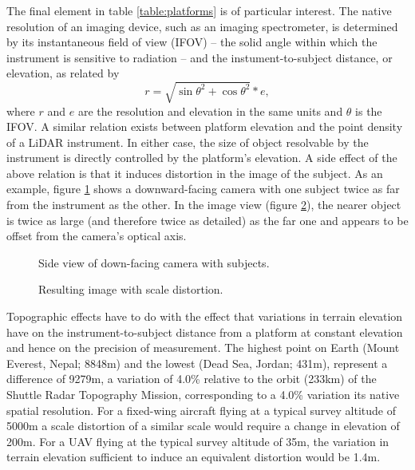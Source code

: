 \documentclass[10pt,a4paper]{report}
\begin{document}
The final element in table \ref{table:platforms} is of particular interest. The native resolution of an imaging device, such as an imaging spectrometer, is determined by its instantaneous field of view (IFOV) -- the solid angle within which the instrument is sensitive to radiation -- and the instument-to-subject distance, or elevation, as related by
\begin{equation}
r = \sqrt{\sin{\theta}^2+\cos{\theta}^2}*e,
\label{eq:ifov}
\end{equation} 
where $r$ and $e$ are the resolution and elevation in the same units and $\theta$ is the IFOV. A similar relation exists between platform elevation and the point density of a LiDAR instrument. In either case, the size of object resolvable by the instrument is directly controlled by the platform's elevation. A side effect of the above relation is that it induces distortion in the image of the subject. As an example, figure \ref{fig:scale_cam} shows a downward-facing camera with one subject twice as far from the instrument as the other. In the image view (figure \ref{fig:scale_img}), the nearer object is twice as large (and therefore twice as detailed) as the far one and appears to be offset from the camera's optical axis.

\begin{figure}
\centering
\def\svgscale{0.5}

\caption{Side view of down-facing camera with subjects.}
\label{fig:scale_cam}
\end{figure}

\begin{figure}
\centering
\def\svgscale{0.5}

\caption{Resulting image with scale distortion.}
\label{fig:scale_img}
\end{figure}


Topographic effects have to do with the effect that variations in terrain elevation have on the instrument-to-subject distance from a platform at constant elevation and hence on the precision of measurement. The highest point on Earth (Mount Everest, Nepal; 8848m) and the lowest (Dead Sea, Jordan; 431m), represent a difference of 9279m, a variation of 4.0\% relative to the orbit (233km) of the  Shuttle Radar Topography Mission, corresponding to a 4.0\% variation its native spatial resolution. For a fixed-wing aircraft flying at a typical survey altitude of 5000m a scale distortion of a similar scale would require a change in elevation of 200m. For a UAV flying at the typical survey altitude of 35m, the variation in terrain elevation sufficient to induce an equivalent distortion would be 1.4m.
\end{document}
